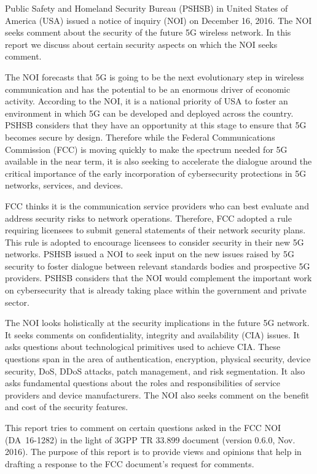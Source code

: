 \documentclass[12pt]{llncs}
\begin{document}
Public Safety and Homeland Security Bureau (PSHSB) in United States of America (USA) issued a notice of inquiry (NOI) on December 16, 2016. The NOI seeks comment about the security of the future 5G wireless network. In this report we discuss about certain security aspects on which the NOI seeks comment.

The NOI forecasts that 5G is going to be the next evolutionary step in wireless communication and has the potential to be an enormous driver of economic activity. According to the NOI, it is a national priority of USA to foster an environment in which 5G can be developed and deployed across the country. PSHSB considers that they have an opportunity at this stage to ensure that 5G becomes secure by design. Therefore while the Federal Communications Commission (FCC) is moving quickly to make the spectrum needed for 5G available in the near term, it is also seeking to accelerate the dialogue around the critical importance of the early incorporation of cybersecurity protections in 5G networks, services, and devices.

FCC thinks it is the communication service providers who can best evaluate and address security risks to network operations. Therefore, FCC adopted a rule requiring licensees to submit general statements of their network security plans. This rule is adopted to encourage licensees to consider security in their new 5G networks. PSHSB issued a NOI to seek input on the new issues raised by 5G security to foster dialogue between relevant standards bodies and prospective 5G providers. PSHSB considers that the NOI would complement the important work on cybersecurity that is already taking place within the government and private sector.

The NOI looks holistically at the security implications in the future 5G network. It seeks comments on confidentiality, integrity and availability (CIA) issues. It asks questions about technological primitives used to achieve CIA. These questions span in the area of authentication, encryption, physical security, device security, DoS, DDoS attacks, patch management, and risk segmentation. It also asks fundamental questions about the roles and responsibilities of service providers and device manufacturers. The NOI also seeks comment on the benefit and cost of the security features.

This report tries to comment on certain questions asked in the FCC NOI (DA~16-1282) in the light of 3GPP TR 33.899 document (version 0.6.0, Nov. 2016). The purpose of this report is to provide views and opinions that help in drafting a response to the FCC document's request for comments.
\end{document}
